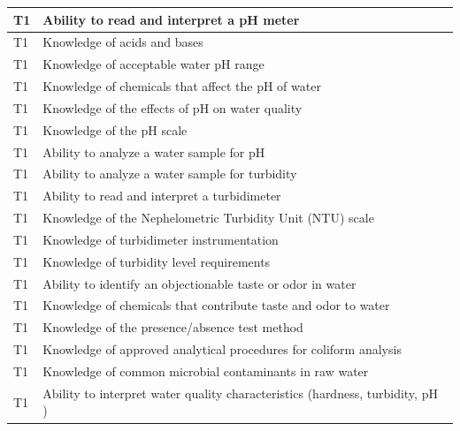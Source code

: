 \begin{table}[H]
\begin{tabular}{| m{1cm} |m{15cm} |}
T1 & Ability to read and   interpret a pH meter                                                        \\ \hline
T1 & Knowledge of acids   and bases                                                                    \\ \hline
T1 & Knowledge of   acceptable water pH range                                                          \\ \hline
T1 & Knowledge of   chemicals that affect the pH of water                                              \\ \hline
T1 & Knowledge of the   effects of pH on water quality                                                 \\ \hline
T1 & Knowledge of the pH   scale                                                                       \\ \hline
T1 & Ability to analyze a   water sample for pH                                                        \\ \hline
T1 & Ability to analyze a   water sample for turbidity                                                 \\ \hline
T1 & Ability to read and   interpret a turbidimeter                                                    \\ \hline
T1 & Knowledge of the   Nephelometric Turbidity Unit (NTU) scale                                       \\ \hline
T1 & Knowledge of   turbidimeter instrumentation                                                       \\ \hline
T1 & Knowledge of   turbidity level requirements                                                       \\ \hline
T1 & Ability to identify   an objectionable taste or odor in water                                     \\ \hline
T1 & Knowledge of   chemicals that contribute taste and odor to water                                  \\ \hline
T1 & Knowledge of the   presence/absence test method                                                   \\ \hline
T1 & Knowledge of approved   analytical procedures for coliform analysis                               \\ \hline
T1 & Knowledge of common   microbial contaminants in raw water                                         \\ \hline
T1 & Ability to interpret   water quality characteristics (hardness, turbidity, pH )                   \\ \hline
\end{tabular}
\end{table}
\newpage



